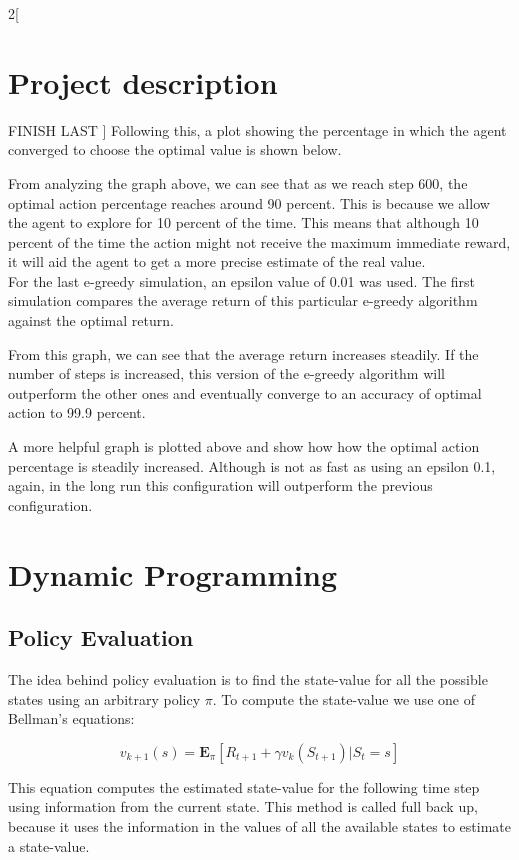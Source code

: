 \documentclass[a4paper]{article}
\begin{document}
\begin{multicols}{2}[
		\section*{Project description}
		FINISH LAST
		]
		Following this, a plot showing the percentage in which the agent converged to choose the optimal value is shown below.
		

		
		From analyzing the graph above, we can see that as we reach step 600, the optimal action percentage reaches around 90 percent. This is because we allow the agent to explore for 10 percent of the time. This means that although 10 percent of the time the action might not receive the maximum immediate reward, it will aid the agent to get a more precise estimate of the real value. \\
		
		For the last e-greedy simulation, an epsilon value of 0.01 was used. The first simulation compares the average return of this particular e-greedy algorithm against the optimal return.
		
		
		From this graph, we can see that the average return increases steadily. If the number of steps is increased, this version of the e-greedy algorithm will outperform the other ones and eventually converge to an accuracy of optimal action to 99.9 percent.
		
	
		A more helpful graph is plotted above and show how how the optimal action percentage is steadily increased. Although is not as fast as using an epsilon 0.1, again, in the long run this configuration will outperform the previous configuration.
		
		\section{Dynamic Programming}
		\subsection{Policy Evaluation}
		The idea behind policy evaluation is to find the state-value for all the possible states using an arbitrary policy $\pi$. To compute the state-value we use one of Bellman's equations:
		
		\begin{equation}
			v_{k+1}(s) = \mathbf{E}_\pi[R_{t+1} + \gamma v_k(S_{t+1}) | S_t = s]
		\end{equation}
		
		This equation computes the estimated state-value for the following time step using information from the current state. This method is called full back up, because it uses the information in the values of all the available states to estimate a state-value.
		

\end{multicols}
\end{document}
